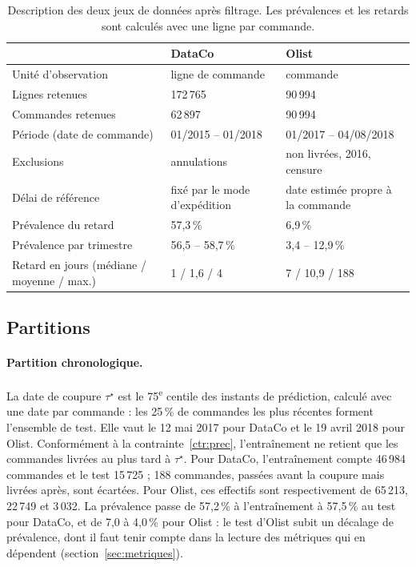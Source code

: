 \documentclass[11pt,a4paper]{article}
\theoremstyle{definition}
\begin{document}
\begin{table}[!htbp]
\centering
\footnotesize
\caption{Description des deux jeux de données après filtrage. Les prévalences et les retards sont calculés avec une ligne par commande.}
\label{tab:donnees}
\begin{tabular}{@{}lll@{}}
\toprule
 & DataCo & Olist \\
\midrule
Unité d'observation & ligne de commande & commande \\
Lignes retenues & 172\,765 & 90\,994 \\
Commandes retenues & 62\,897 & 90\,994 \\
Période (date de commande) & 01/2015 -- 01/2018 & 01/2017 -- 04/08/2018 \\
Exclusions & annulations & non livrées, 2016, censure \\
Délai de référence & fixé par le mode d'expédition & date estimée propre à la commande \\
Prévalence du retard & 57,3\,\% & 6,9\,\% \\
Prévalence par trimestre & 56,5 -- 58,7\,\% & 3,4 -- 12,9\,\% \\
Retard en jours (médiane / moyenne / max.) & 1 / 1,6 / 4 & 7 / 10,9 / 188 \\
\bottomrule
\end{tabular}
\end{table}

\subsection{Partitions}
\label{sec:partitions}

\paragraph{Partition chronologique.} La date de coupure $\tau^\star$ est le 75\textsuperscript{e} centile des instants de prédiction, calculé avec une date par commande : les 25\,\% de commandes les plus récentes forment l'ensemble de test. Elle vaut le 12 mai 2017 pour DataCo et le 19 avril 2018 pour Olist. Conformément à la contrainte~\ref{ctr:prec}, l'entraînement ne retient que les commandes livrées au plus tard à $\tau^\star$. Pour DataCo, l'entraînement compte 46\,984 commandes et le test 15\,725 ; 188 commandes, passées avant la coupure mais livrées après, sont écartées. Pour Olist, ces effectifs sont respectivement de 65\,213, 22\,749 et 3\,032. La prévalence passe de 57,2\,\% à l'entraînement à 57,5\,\% au test pour DataCo, et de 7,0 à 4,0\,\% pour Olist : le test d'Olist subit un décalage de prévalence, dont il faut tenir compte dans la lecture des métriques qui en dépendent (section~\ref{sec:metriques}).
\end{document}
